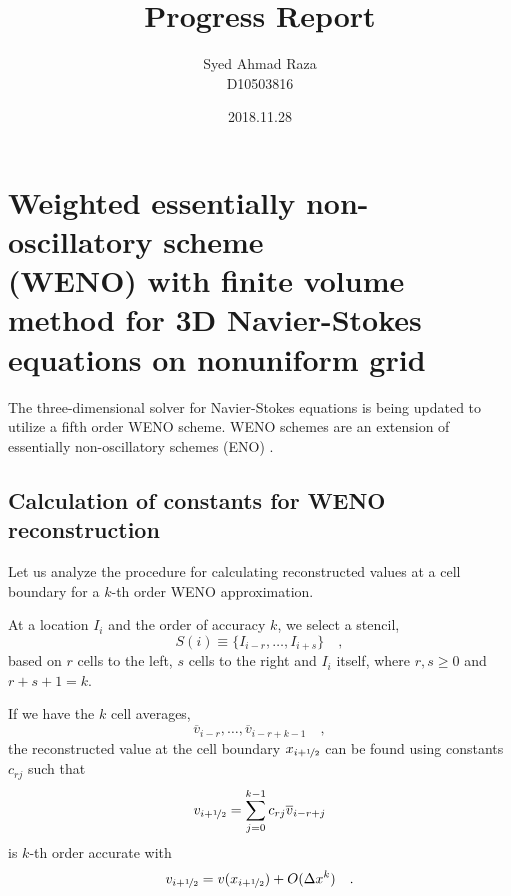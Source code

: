\documentclass[12pt,a4paper,fleqn]{article}
\title{Progress Report}
\author{Syed Ahmad Raza\\
        D10503816}
\date{2018.11.28}
\begin{document}
\maketitle

\section{Weighted essentially non-oscillatory scheme\\(WENO) with finite volume method for 3D Navier-Stokes equations on nonuniform grid}

The three-dimensional solver for Navier-Stokes equations is being updated to utilize a fifth order WENO scheme. WENO schemes are an extension of essentially non-oscillatory schemes (ENO) \cite{cockburn_shu_johnson_tadmor_quarteroni_1998}.

\subsection{Calculation of constants for WENO reconstruction}

Let us analyze the procedure for calculating reconstructed values at a cell boundary for a \(k\)-th order WENO approximation.

At a location \(I_i\) and the order of accuracy \(k\), we select a stencil,
\begin{equation}
S(i) \equiv \{I_{i-r}, \ldots, I_{i+s}\} \quad,
\end{equation}
based on \(r\) cells to the left, \(s\) cells to the right and \(I_i\) itself, where \(r,s \ge 0\) and \(r+s+1=k\).

If we have the \(k\) cell averages,
\begin{equation}
\overline{v}_{i-r}, \ldots, \overline{v}_{i-r+k-1} \quad,
\end{equation}
the reconstructed value at the cell boundary \(x_{i+\nicefrac{1}{2}}\) can be found using constants \(c_{rj}\) such that
\begin{equation}
v_{i+\nicefrac{1}{2}} = \sum_{j=0}^{k-1}c_{rj}\overline{v}_{i-r+j}
\end{equation}
is \(k\)-th order accurate with
\begin{equation}
v_{i+\nicefrac{1}{2}} = v(x_{i+\nicefrac{1}{2}}) + O(\Delta x^k) \quad.
\end{equation}
\end{document}
